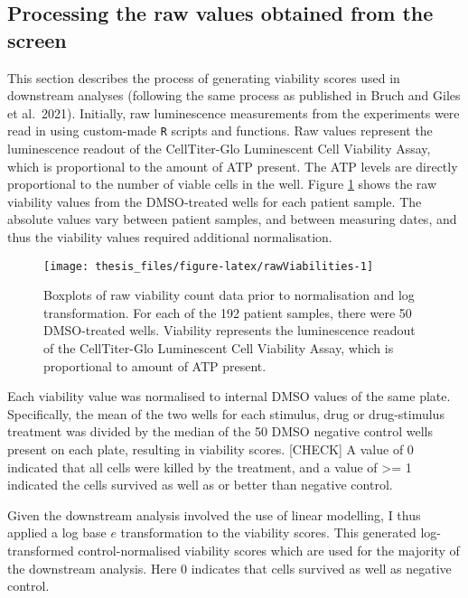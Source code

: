 \documentclass[11pt, a4paper, twosided]{book}
\begin{document}
\hypertarget{processing-the-raw-values-obtained-from-the-screen}{%
\subsection{Processing the raw values obtained from the screen}\label{processing-the-raw-values-obtained-from-the-screen}}

This section describes the process of generating viability scores used in downstream analyses (following the same process as published in Bruch and Giles et al.~2021). Initially, raw luminescence measurements from the experiments were read in using custom-made \texttt{R} scripts and functions. Raw values represent the luminescence readout of the CellTiter-Glo Luminescent Cell Viability Assay, which is proportional to the amount of ATP present. The ATP levels are directly proportional to the number of viable cells in the well.
Figure \ref{fig:rawViabilities} shows the raw viability values from the DMSO-treated wells for each patient sample. The absolute values vary between patient samples, and between measuring dates, and thus the viability values required additional normalisation.


\begin{figure}

{\centering \texttt{[image: thesis\_files/figure-latex/rawViabilities-1]} 

}

\caption{Boxplots of raw viability count data prior to normalisation and log transformation. For each of the 192 patient samples, there were 50 DMSO-treated wells. Viability represents the luminescence readout of the CellTiter-Glo Luminescent Cell Viability Assay, which is proportional to amount of ATP present.}\label{fig:rawViabilities}
\end{figure}
Each viability value was normalised to internal DMSO values of the same plate. Specifically, the mean of the two wells for each stimulus, drug or drug-stimulus treatment was divided by the median of the 50 DMSO negative control wells present on each plate, resulting in viability scores. {[}CHECK{]} A value of 0 indicated that all cells were killed by the treatment, and a value of \textgreater= 1 indicated the cells survived as well as or better than negative control.

Given the downstream analysis involved the use of linear modelling, I thus applied a log base \(e\) transformation to the viability scores. This generated log-transformed control-normalised viability scores which are used for the majority of the downstream analysis. Here 0 indicates that cells survived as well as negative control.
\end{document}
